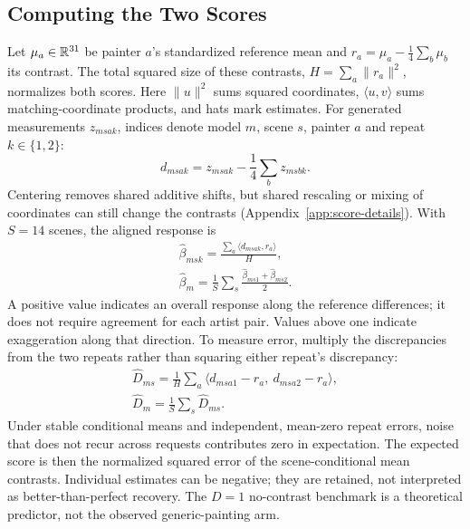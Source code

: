 \subsection{Computing the Two Scores}
Let $\mu_a\in\mathbb R^{31}$ be painter $a$'s standardized reference mean and
$r_a=\mu_a-\frac14\sum_b\mu_b$ its contrast. The total squared size of these
contrasts, $H=\sum_a\|r_a\|^2$, normalizes both scores. Here $\|u\|^2$ sums squared
coordinates, $\langle u,v\rangle$ sums matching-coordinate products, and
hats mark estimates. For generated measurements $z_{msak}$, indices denote
model $m$, scene $s$, painter $a$ and repeat $k\in\{1,2\}$:
\begin{equation}
 d_{msak}=z_{msak}-\frac14\sum_b z_{msbk}.
 \label{eq:center}
\end{equation}
Centering removes shared additive shifts, but shared rescaling or mixing
of coordinates can still change the contrasts
(Appendix~\ref{app:score-details}). With $S=14$ scenes, the aligned response is
\begin{equation}
\begin{gathered}
\widehat\beta_{msk}=\frac{\sum_a\langle d_{msak},r_a\rangle}{H},\\
\widehat\beta_m=\frac1S\sum_s\frac{\widehat\beta_{ms1}+\widehat\beta_{ms2}}2.
\end{gathered}
\label{eq:beta}
\end{equation}
A positive value indicates an overall response along the reference differences;
it does not require agreement for each artist pair. Values above one indicate
exaggeration along that direction. To measure error, multiply the discrepancies
from the two repeats rather than squaring either repeat's discrepancy:
\begin{equation}
\begin{gathered}
\widehat D_{ms}=\frac1H\sum_a
\langle d_{msa1}-r_a,\ d_{msa2}-r_a\rangle,\\
\widehat D_m=\frac1S\sum_s\widehat D_{ms}.
\end{gathered}
\label{eq:distortion}
\end{equation}
Under stable conditional means and independent, mean-zero repeat errors,
noise that does not recur across requests contributes zero in expectation.
The expected score is then the normalized squared error of the scene-conditional
mean contrasts. Individual estimates can be negative; they are retained, not
interpreted as better-than-perfect recovery. The $D=1$ no-contrast benchmark
is a theoretical predictor, not the observed generic-painting arm.

